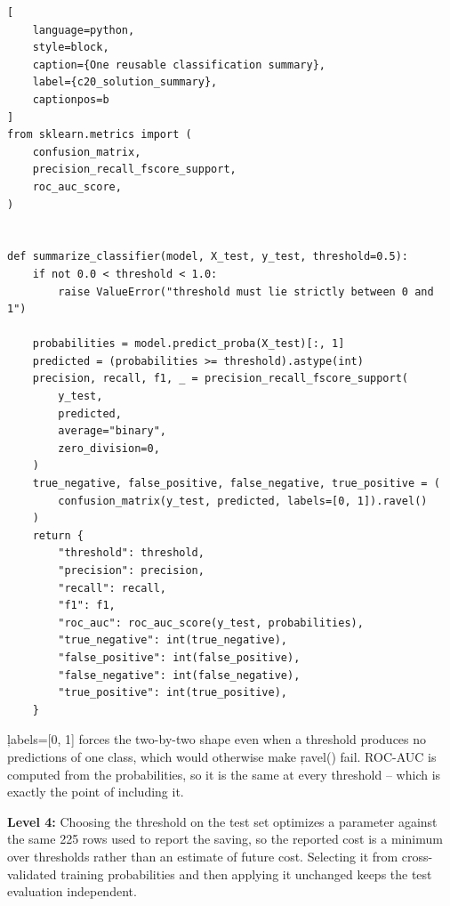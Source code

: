 \begin{lstlisting}[
    language=python,
    style=block,
    caption={One reusable classification summary},
    label={c20_solution_summary},
    captionpos=b
]
from sklearn.metrics import (
    confusion_matrix,
    precision_recall_fscore_support,
    roc_auc_score,
)


def summarize_classifier(model, X_test, y_test, threshold=0.5):
    if not 0.0 < threshold < 1.0:
        raise ValueError("threshold must lie strictly between 0 and 1")

    probabilities = model.predict_proba(X_test)[:, 1]
    predicted = (probabilities >= threshold).astype(int)
    precision, recall, f1, _ = precision_recall_fscore_support(
        y_test,
        predicted,
        average="binary",
        zero_division=0,
    )
    true_negative, false_positive, false_negative, true_positive = (
        confusion_matrix(y_test, predicted, labels=[0, 1]).ravel()
    )
    return {
        "threshold": threshold,
        "precision": precision,
        "recall": recall,
        "f1": f1,
        "roc_auc": roc_auc_score(y_test, probabilities),
        "true_negative": int(true_negative),
        "false_positive": int(false_positive),
        "false_negative": int(false_negative),
        "true_positive": int(true_positive),
    }
\end{lstlisting}

\c{labels=[0, 1]} forces the two-by-two shape even when a threshold produces no
predictions of one class, which would otherwise make \c{ravel()} fail. ROC-AUC is
computed from the probabilities, so it is the same at every threshold -- which is
exactly the point of including it.

\textbf{Level 4:} Choosing the threshold on the test set optimizes a parameter
against the same 225 rows used to report the saving, so the reported cost is a
minimum over thresholds rather than an estimate of future cost. Selecting it from
cross-validated training probabilities and then applying it unchanged keeps the
test evaluation independent.


